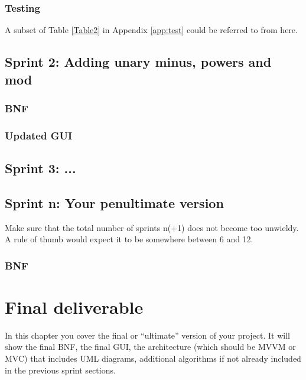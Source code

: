 \documentclass[a4paper, oneside, 11pt]{report}
\begin{document}
\subsection{Testing}
A subset of Table \ref{Table2} in Appendix \ref{app:test} could be referred to from here.

\section{Sprint 2: Adding unary minus, powers and mod}

\subsection{BNF}

\subsection{Updated GUI}

\section{Sprint 3: ...}

\section{Sprint n: Your penultimate version}

Make sure that the total number of sprints n(+1) does not become too unwieldy. A rule of thumb would expect it to be somewhere between 6 and 12.

\subsection{BNF}

\subsection{}

\chapter{Final deliverable}\label{Impl}

In this chapter you cover the final or ``ultimate'' version of your project. It will show the final BNF, the final GUI, the architecture (which should be MVVM or MVC) that includes UML diagrams, additional algorithms if not already included in the previous sprint sections.
\end{document}
